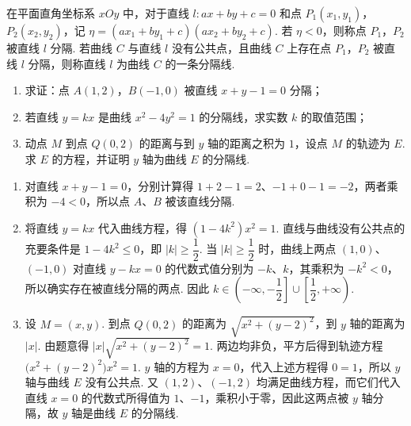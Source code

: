 \begin{problem}
在平面直角坐标系 \(xOy\) 中，对于直线 \(l: ax + by + c = 0\) 和点 \(P_{1}(x_{1}, y_{1})\)，\(P_{2}(x_{2}, y_{2})\)，记 \(\eta = (ax_{1} + by_{1} + c)(ax_{2} + by_{2} + c)\). 若 \(\eta < 0\)，则称点 \(P_{1}\)，\(P_{2}\) 被直线 \(l\) 分隔. 若曲线 \(C\) 与直线 \(l\) 没有公共点，且曲线 \(C\) 上存在点 \(P_{1}\)，\(P_{2}\) 被直线 \(l\) 分隔，则称直线 \(l\) 为曲线 \(C\) 的一条分隔线.

\begin{enumerate}
\item 求证：点 \(A(1,2)\)，\(B(-1,0)\) 被直线 \(x + y - 1 = 0\) 分隔；
\item 若直线 \(y = kx\) 是曲线 \(x^2 - 4y^2 = 1\) 的分隔线，求实数 \(k\) 的取值范围；
\item 动点 \(M\) 到点 \(Q(0,2)\) 的距离与到 \(y\) 轴的距离之积为 \(1\)，设点 \(M\) 的轨迹为 \(E\). 求 \(E\) 的方程，并证明 \(y\) 轴为曲线 \(E\) 的分隔线.
\end{enumerate}

\begin{solution}
\begin{enumerate}
\item 对直线 \(x+y-1=0\)，分别计算得 \(1+2-1=2\)、\(-1+0-1=-2\)，两者乘积为 \(-4<0\)，所以点 \(A\)、\(B\) 被该直线分隔.
\item 将直线 \(y=kx\) 代入曲线方程，得 \((1-4k^2)x^2=1\). 直线与曲线没有公共点的充要条件是 \(1-4k^2\leqslant0\)，即 \(|k|\geqslant\dfrac12\). 当 \(|k|\geqslant\dfrac12\) 时，曲线上两点 \((1,0)\)、\((-1,0)\) 对直线 \(y-kx=0\) 的代数式值分别为 \(-k\)、\(k\)，其乘积为 \(-k^2<0\)，所以确实存在被直线分隔的两点. 因此 \(k\in\left(-\infty,-\dfrac12\right]\cup\left[\dfrac12,+\infty\right)\).
\item 设 \(M=(x,y)\). 到点 \(Q(0,2)\) 的距离为 \(\sqrt{x^2+(y-2)^2}\)，到 \(y\) 轴的距离为 \(|x|\). 由题意得 \(|x|\sqrt{x^2+(y-2)^2}=1\). 两边均非负，平方后得到轨迹方程
\(\bigl(x^2+(y-2)^2\bigr)x^2=1\).
\(y\) 轴的方程为 \(x=0\)，代入上述方程得 \(0=1\)，所以 \(y\) 轴与曲线 \(E\) 没有公共点. 又 \((1,2)\)、\((-1,2)\) 均满足曲线方程，而它们代入直线 \(x=0\) 的代数式所得值为 \(1\)、\(-1\)，乘积小于零，因此这两点被 \(y\) 轴分隔，故 \(y\) 轴是曲线 \(E\) 的分隔线.
\end{enumerate}
\end{solution}
\end{problem}

